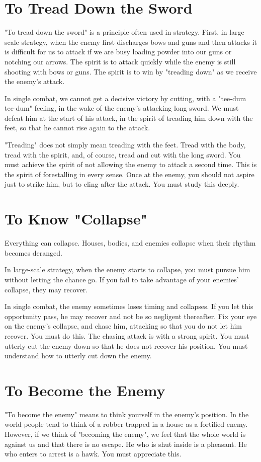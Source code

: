 \documentclass[12pt]{report}
\begin{document}
\section*{To Tread Down the Sword}
"To tread down the sword" is a principle often used in strategy. First, in large scale strategy, when the enemy first discharges bows and guns and then attacks it is difficult for us to attack if we are busy loading powder into our guns or notching our arrows. The spirit is to attack quickly while the enemy is still shooting with bows or guns. The spirit is to win by "treading down" as we receive the enemy's attack.

In single combat, we cannot get a decisive victory by cutting, with a "tee-dum tee-dum" feeling, in the wake of the enemy's attacking long sword. We must defeat him at the start of his attack, in the spirit of treading him down with the feet, so that he cannot rise again to the attack.

"Treading" does not simply mean treading with the feet. Tread with the body, tread with the spirit, and, of course, tread and cut with the long sword. You must achieve the spirit of not allowing the enemy to attack a second time. This is the spirit of forestalling in every sense. Once at the enemy, you should not aspire just to strike him, but to cling after the attack. You must study this deeply.
\clearpage
\section*{To Know "Collapse"}
Everything can collapse. Houses, bodies, and enemies collapse when their rhythm becomes deranged.

In large-scale strategy, when the enemy starts to collapse, you must pursue him without letting the chance go. If you fail to take advantage of your enemies' collapse, they may recover.

In single combat, the enemy sometimes loses timing and collapses. If you let this opportunity pass, he may recover and not be so negligent thereafter. Fix your eye on the enemy's collapse, and chase him, attacking so that you do not let him recover. You must do this. The chasing attack is with a strong spirit. You must utterly cut the enemy down so that he does not recover his position. You must understand how to utterly cut down the enemy.
\section*{To Become the Enemy}
"To become the enemy" means to think yourself in the enemy's position. In the world people tend to think of a robber trapped in a house as a fortified enemy. However, if we think of "becoming the enemy", we feel that the whole world is against us and that there is no escape. He who is shut inside is a pheasant. He who enters to arrest is a hawk. You must appreciate this.
\end{document}
